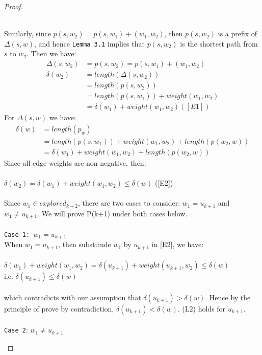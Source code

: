 \documentclass[11pt, oneside]{article}   	%
\newcommand\tab[1][1cm]{\hspace*{#1}}
\theoremstyle{definition}
\begin{document}
\begin{proof}
\begin{itemize}
\begin{enumerate}
  \\
  Similarly, since $p(s, w_2) = p(s, w_1) + (w_1, w_2)$, then $p(s, w_2)$ is a prefix of $\Delta(s, w)$, and hence \texttt{Lemma 3.1} implies that $p(s, w_2)$ is the shortest path from $s$ to $w_2$. Then we have: 
  \begin{align*} 
      \Delta(s, w_2) &= p(s, w_2) = p(s, w_1) + (w_1, w_2) \\
      \delta(w_2) &= length(\Delta(s, w_2)) \\
                  &= length(p(s, w_2)) \\
                  &= length(p(s, w_1)) + weight(w_1, w_2)\\
                  &= \delta(w_1) + weight(w_1, w_2) ([E1])
  \end{align*}
  For $\Delta(s, w)$ we have: 
  \begin{align*}
    \delta(w) &= length(p_w) \\
              &= length(p(s, w_1)) + weight(w_1, w_2) + length(p(w_2, w)) \\
              &= \delta(w_1) + weight(w_1, w_2) + length(p(w_2, w))
  \end{align*}
  Since all edge weights are non-negative, then: 
  \\\\
    \tab $\delta(w_2) = \delta(w_1) + weight(w_1, w_2) \leq \delta(w)$ ([E2])
  \\\\
  Since $w_1 \in explored_{k+2}$, there are two cases to consider: $w_1 =u_{k+1}$ and $w_1 \neq u_{k+1}$. We will prove P(k+1) under both cases below. 
  \\\\
  \texttt{Case 1: $w_1 = u_{k+1}$}
  \\
  When $w_1 = u_{k+1}$, then substitude $w_1$ by $u_{k+1}$ in [E2], we have: 
  \\\\
    \tab $\delta(w_1) + weight(w_1, w_2) = \delta(u_{k+1}) + weight(u_{k+1}, w_2) \leq \delta(w)$\\
    \tab i.e.  $\delta(u_{k+1}) \leq \delta(w)$ 
  \\\\
  which contradicts with our assumption that $\delta(u_{k+1}) > \delta(w)$. Hence by the principle of prove by contradiction, $\delta(u_{k+1}) < \delta(w)$. (L2) holds for $u_{k+1}$. 
  \\\\
  \texttt{Case 2}: $w_1 \neq u_{k+1}$
  \\ 


\end{enumerate}
\end{itemize}
\end{proof}
\end{document}
